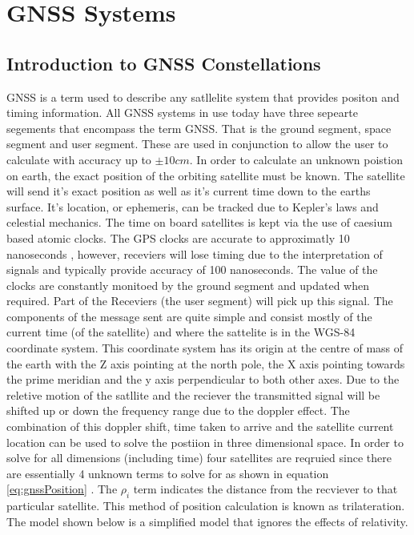 \section{GNSS Systems} \label{sec:GNSS}
\subsection{Introduction to GNSS Constellations}\label{subsec:GNSS_Intro}
GNSS is a term used to describe any satllelite system that provides positon and timing information. All GNSS systems in use today have three sepearte segements that
encompass the term GNSS. That is the ground segment, space segment and user segment. These are used in conjunction to allow the user to calculate with accuracy up to $\pm
10cm$. In order to calculate an unknown poistion on earth, the exact position of the orbiting satellite must be known. The satellite will send it's exact position as well
as it's current time down to the earths surface. It's location, or ephemeris, can be tracked due to Kepler's laws and celestial mechanics. The time on board satellites is
kept via the use of caesium based atomic clocks. The GPS clocks are accurate to approximatly 10 nanoseconds , however, receviers will lose timing due to
the interpretation of signals and typically provide accuracy of 100 nanoseconds. The value of the clocks are constantly monitoed by the ground segment and updated when
required. Part of the Receviers (the user segment) will pick up this signal. The components of the message sent are quite simple and consist
mostly of the current time (of the satellite) and where the sattelite is in the WGS-84 coordinate system\cite{RN46}. This coordinate system has its origin at the centre of mass of
the earth with the Z axis pointing at the north pole, the X axis pointing towards the prime meridian and the y axis perpendicular to both other axes. Due to the reletive
motion of the satllite and the reciever the transmitted signal will be shifted up or down the frequency range due to the doppler effect. The combination of this doppler
shift, time taken to arrive and the satellite current location can be used to solve the postiion in three dimensional space. In order to solve for all dimensions
(including time) four satellites are reqruied since there are essentially 4 unknown terms to solve for as shown in equation \ref{eq:gnssPosition} \cite{RN46}. The
$\rho_i$ term indicates the distance from the recviever to that particular satellite. This method of position calculation is known as trilateration. The model shown below
is a simplified model that ignores the effects of relativity. 

